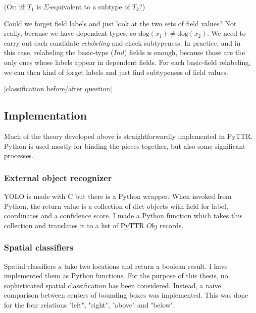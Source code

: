 \documentclass[11pt, a4paper]{article}
\begin{document}
(Or: iff $T_1$ is $\Sigma$-equivalent to a subtype of $T_2$?)

Could we forget field labels and just look at the two sets of field values? Not really, because we have dependent types, so $\text{dog}(x_1) ≠ \text{dog}(x_2)$. We need to carry out each candidate \textit{relabeling} and check subtypeness. In practice, and in this case, relabeling the basic-type ($Ind$) fields is enough, because those are the only ones whose labels appear in dependent fields. For each basic-field relabeling, we can then kind of forget labels and just find subtypeness of field values.

[classification before/after question]



\subsection{Implementation}

Much of the theory developed above is straightforwardly implemented in PyTTR.
Python is used mostly for binding the pieces together, but also some significant processes.



\subsubsection{External object recognizer}

YOLO \citep{yolo} is made with C but there is a Python wrapper.
When invoked from Python, the return value is a collection of dict objects with field for label, coordinates and a confidence score.
I made a Python function which takes this collection and translates it to a list of PyTTR $Obj$ records.



\subsubsection{Spatial classifiers}

Spatial classifiers $\kappa$ take two locations and return a boolean result.
I have implemented them as Python functions.
For the purpose of this thesis, no sophisticated spatial classification has been considered.
Instead, a naive comparison between centers of bounding boxes was implemented.
This was done for the four relations "left", "right", "above" and "below".
\end{document}
